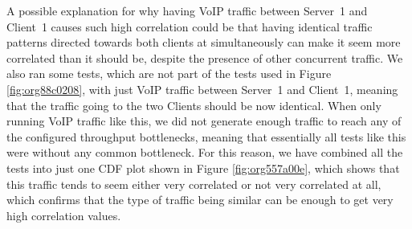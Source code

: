 \documentclass[a4paper,11pt]{article}
\begin{document}
A possible explanation for why having VoIP traffic between Server~1 and Client~1 causes such high correlation could be that having identical traffic patterns directed towards both clients at simultaneously can make it seem more correlated than it should be, despite the presence of other concurrent traffic. We also ran some tests, which are not part of the tests used in Figure \ref{fig:org88c0208}, with just VoIP traffic between Server~1 and Client~1, meaning that the traffic going to the two Clients should be now identical. When only running VoIP traffic like this, we did not generate enough traffic to reach any of the configured throughput bottlenecks, meaning that essentially all tests like this were without any common bottleneck. For this reason, we have combined all the tests into just one CDF plot shown in Figure \ref{fig:org557a00e}, which shows that this traffic tends to seem either very correlated or not very correlated at all, which confirms that the type of traffic being similar can be enough to get very high correlation values.
\end{document}
